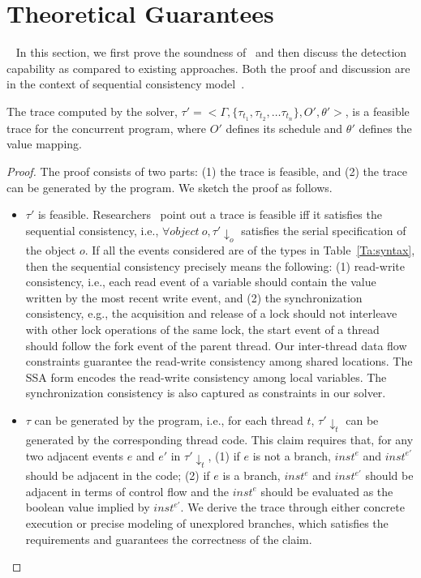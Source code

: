 \section{Theoretical Guarantees}~\label{sec:guarantee}
In this section, we first prove the soundness of \tool\ and then discuss the detection capability as compared to existing approaches.
Both the proof and discussion are in the context of sequential consistency model~\cite{scmodel}.

\begin{mytheorem}[Soundness]
The trace computed by the solver,  $\tau'=<\Gamma , \{\tau_{t_1}, \tau_{t_2}, \dots \tau_{t_n} \}, O', \theta'>$, is a feasible trace for the concurrent program, where $O'$ defines its schedule and $\theta'$ defines the value mapping.
\end{mytheorem}

\begin{proof}
The proof consists of two parts: (1) the trace is feasible, and (2) the trace can be generated by the program. We sketch the proof as follows.
\begin{itemize}
\item  $\tau'$ is feasible. Researchers~\cite{chao,maximal} point out a 
trace is feasible iff it satisfies the sequential consistency, 
i.e., $\forall object\ o, \tau'\downarrow_{o}$ satisfies the serial 
specification of the object $o$. If  all the events considered are of 
the types in Table~\ref{Ta:syntax}, then the sequential consistency 
precisely means the following: (1) read-write consistency, i.e., each 
read event of a variable should contain the value written by the most 
recent write event, and (2) the synchronization consistency, e.g., the 
acquisition and release of a lock should not interleave with other 
lock operations of the same lock, the start event of a thread should 
follow the fork event of the parent thread. Our inter-thread data 
flow constraints guarantee the read-write consistency among shared 
locations. The SSA form encodes the read-write consistency among local 
variables. The synchronization consistency is also captured as constraints 
in our solver. 
\item $\tau$ can be generated by the program, i.e., for each 
thread $t$, $\tau'\downarrow_{t}$ can be generated by the corresponding 
thread code. This claim requires that,  for any two adjacent 
events $e$ and $e'$ in  $\tau'\downarrow_{t}$, (1) if $e$ is not a 
branch, $inst^e$ and $inst^{e'}$ should be adjacent in the code; (2) 
if $e$ is a branch, $inst^e$ and $inst^{e'}$ should be adjacent in terms
of control flow and the $inst^e$ should be evaluated as the boolean 
value implied by $inst^{e'}$. We derive the trace  through either 
concrete execution or precise modeling of unexplored branches, 
which satisfies the requirements and guarantees the correctness of the claim.
\end{itemize}
\end{proof}




